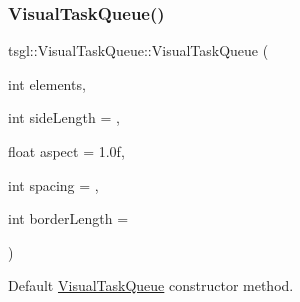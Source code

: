 \subsubsection{\texorpdfstring{Visual\+Task\+Queue()}{VisualTaskQueue()}}
{\footnotesize\ttfamily tsgl\+::\+Visual\+Task\+Queue\+::\+Visual\+Task\+Queue (\begin{DoxyParamCaption}\item[{int}]{elements,  }\item[{int}]{side\+Length = {},  }\item[{float}]{aspect = {\ttfamily 1.0f},  }\item[{int}]{spacing = {},  }\item[{int}]{border\+Length = {} }\end{DoxyParamCaption})}



Default \hyperlink{classtsgl_1_1_visual_task_queue}{Visual\+Task\+Queue} constructor method. 

